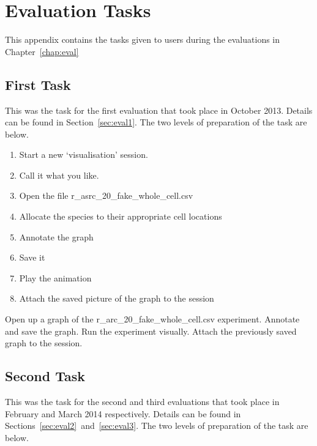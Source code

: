 \section{Evaluation Tasks}
\label{sec:tasks}

This appendix contains the tasks given to users during the evaluations in Chapter~\ref{chap:eval}

\subsection{First Task}
\label{sec:task1}

This was the task for the first evaluation that took place in October 2013.  Details can be found in Section~\ref{sec:eval1}.  The two levels of preparation of the task are below.

\begin{enumerate}
\item Start a new `visualisation' session.
\item Call it what you like.
\item Open the file r\_asrc\_20\_fake\_whole\_cell.csv
\item Allocate the species to their appropriate cell locations
\item Annotate the graph
\item Save it
\item Play the animation
\item Attach the saved picture of the graph to the session
\end{enumerate}

Open up a graph of the r\_arc\_20\_fake\_whole\_cell.csv experiment.  Annotate and save the graph.  Run the experiment visually.  Attach the previously saved graph to the session.

\subsection{Second Task}
\label{sec:task2}

This was the task for the second and third evaluations that took place in February and March 2014 respectively.  Details can be found in Sections~\ref{sec:eval2}~and~\ref{sec:eval3}.  The two levels of preparation of the task are below.

